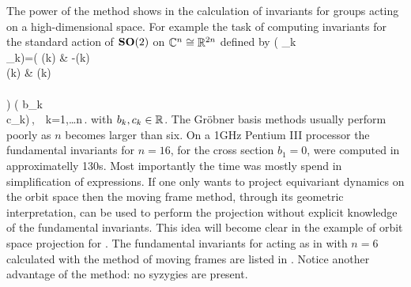 The power of the method shows in the calculation of invariants for groups acting on a high-dimensional space. For example the
task of computing invariants for the standard action of $\mathbf{SO}(2)$ on $\mathbb{C}^{n}\cong\mathbb{R}^{2n}$ defined by
\beq
	\left( _k \\ _k\earr \right)=\left(
			    			\cos(k\theta) & -\sin(k\theta)\\
						\sin(k\theta) & \cos(k\theta)\\
			   			\earr\\	
						\right) \left( b_k \\ c_k\earr\right)\,,\ \ k=1,\ldots n\,.
	\label{eq:SO2stand}
\eeq
with $b_k,c_k\in\mathbb{R}^{}$. The Gr\"{o}bner basis methods usually perform poorly as $n$ becomes larger than six. On a 1GHz Pentium III processor the fundamental invariants for $n=16$, for the cross 
section $b_1=0$, were computed in approximatelly 130s. Most importantly the time was mostly 
spend in simplification of expressions. If one only wants to project equivariant dynamics on the orbit space then the moving frame method,
through its geometric interpretation, can be used to perform the projection without explicit knowledge of the fundamental invariants. 
This idea will become clear in the example of orbit space projection
for \CLe{}. The fundamental invariants for  acting as in  with
$n=6$ calculated with the method of moving frames are listed in . Notice another advantage of the method: no syzygies are present.

